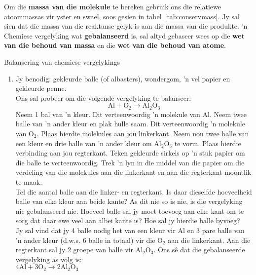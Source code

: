 Om die \textbf{massa van die molekule} te bereken gebruik ons die relatiewe atoommassas vir yster en swael, soos gesien in tabel~\ref{tab:conservmass}. Jy sal sien dat die massa van die reaktanse gelyk is aan die massa van die produkte.  'n Chemiese vergelyking wat \textbf{gebalanseerd} is, sal altyd gebaseer wees op die \textbf{wet van die behoud van massa} en die \textbf{wet van die behoud van atome}.  
      \label{m38726*eip-619}
            \begin{activity}{Balansering van chemiese vergelykings}
            \nopagebreak
\begin{enumerate}[noitemsep, label=\textbf{\arabic*}]
\item            \label{m38726*eip-695}Jy benodig: gekleurde balle (of albasters), wondergom, 'n vel papier en gekleurde penne.\\
Ons sal probeer om die volgende vergelyking te balanseer:
\label{m38726*eid0342}\nopagebreak\noindent{}
    \begin{equation*}
    \text{Al}+{\text{O}}_{2}\to {\text{Al}}_{2}{\text{O}}_{3}
      \end{equation*}
Neem 1 bal van 'n kleur. Dit verteenwoordig 'n molekule van $\text{Al}$. Neem twee balle van 'n ander kleur en plak hulle saam. Dit verteenwoordig 'n molekule van ${\text{O}}_{2}$. Plaas hierdie molekules aan jou linkerkant. Neem nou twee balle van een kleur en drie balle van 'n ander kleur om ${\text{Al}}_{2}{\text{O}}_{3}$ te vorm. Plaas hierdie verbinding aan jou regterkant. Teken gekleurde sirkels op 'n stuk papier om die balle te verteenwoordig. Trek 'n lyn in die middel van die papier om die verdeling van die molekules aan die linkerkant en aan die regterkant moontlik te maak.\\
Tel die aantal balle aan die linker- en regterkant. Is daar dieselfde hoeveelheid balle van elke kleur aan beide kante? As dit nie so is nie, is  die vergelyking nie gebalanseerd nie. Hoeveel balle sal jy moet toevoeg aan elke kant om te sorg dat daar ewe veel aan albei kante is? Hoe sal jy hierdie balle byvoeg?\\
Jy sal vind dat jy  4 balle nodig het van een kleur vir $\text{Al}$ en 3 pare balle van 'n ander kleur (d.w.s. 6 balle in totaal) vir die ${\text{O}}_{2}$ aan die linkerkant. Aan die regterkant sal jy  2 groepe van balle vir ${\text{Al}}_{2}{\text{O}}_{3}$. Ons s\^{e} dat die  gebalanseerde vergelyking as volg is:\\
    $4\text{Al}+3{\text{O}}_{2}\to 2{\text{Al}}_{2}{\text{O}}_{3}$


\end{enumerate}
\end{activity}
